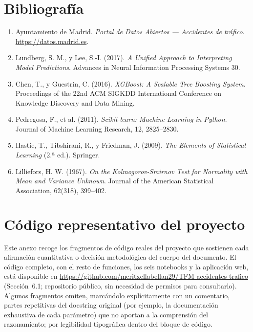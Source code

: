 \documentclass[11pt,a4paper]{article}
\begin{document}
\section*{Bibliografía}

\begin{enumerate}[nosep,leftmargin=1.3cm]
\item Ayuntamiento de Madrid. \emph{Portal de Datos Abiertos --- Accidentes de tráfico}. \url{https://datos.madrid.es}.
\item Lundberg, S. M., y Lee, S.-I. (2017). \emph{A Unified Approach to Interpreting Model Predictions}. Advances in Neural Information Processing Systems 30.
\item Chen, T., y Guestrin, C. (2016). \emph{XGBoost: A Scalable Tree Boosting System}. Proceedings of the 22nd ACM SIGKDD International Conference on Knowledge Discovery and Data Mining.
\item Pedregosa, F., et al. (2011). \emph{Scikit-learn: Machine Learning in Python}. Journal of Machine Learning Research, 12, 2825--2830.
\item Hastie, T., Tibshirani, R., y Friedman, J. (2009). \emph{The Elements of Statistical Learning} (2.ª ed.). Springer.
\item Lilliefors, H. W. (1967). \emph{On the Kolmogorov-Smirnov Test for Normality with Mean and Variance Unknown}. Journal of the American Statistical Association, 62(318), 399--402.
\end{enumerate}

\newpage
\appendix
\section{Código representativo del proyecto}

Este anexo recoge los fragmentos de código reales del proyecto que sostienen cada afirmación cuantitativa o decisión metodológica del cuerpo del documento. El código completo, con el resto de funciones, los seis notebooks y la aplicación web, está disponible en \url{https://github.com/meritxellabellan29/TFM-accidentes-trafico} (Sección~6.1; repositorio público, sin necesidad de permisos para consultarlo). Algunos fragmentos omiten, marcándolo explícitamente con un comentario, partes repetitivas del docstring original (por ejemplo, la documentación exhaustiva de cada parámetro) que no aportan a la comprensión del razonamiento; por legibilidad tipográfica dentro del bloque de código.
\end{document}
